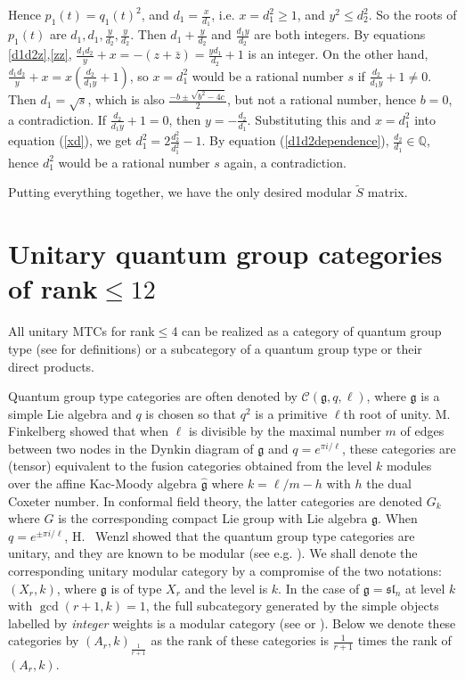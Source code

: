 \documentclass[12pt,psamsfonts]{amsart}
\newcommand{\CC}{\mathcal{C}}
\newcommand{\Rep}{{\rm Rep}}
\newcommand{\g}{\mathfrak{g}}
\newcommand{\Q}{\mathbb Q}
\newcommand{\tS}{\tilde{S}}
\numberwithin{equation}{section}
\theoremstyle{definition}
\begin{document}
Hence $p_1(t)=q_1(t)^2$, and $d_1=\frac{x}{d_1}$, i.e.
$x=d_1^2\geq 1$, and $y^2\leq d_2^2$. So the roots of $p_1(t)$ are
$d_1,d_1,\frac{y}{d_2},\frac{y}{d_2}$. Then $d_1+\frac{y}{d_2}$
and $\frac{d_1y}{d_2}$ are both integers. By equations
\ref{d1d2z},\ref{zz},
$\frac{d_1d_2}{y}+x=-(z+\bar{z})=\frac{yd_1}{d_2}+1$ is an
integer.  On the other hand,
$\frac{d_1d_2}{y}+x=x(\frac{d_2}{d_1y}+1)$, so $x=d_1^2$ would be
a rational number $s$ if $\frac{d_2}{d_1y}+1\neq 0$. Then
$d_1=\sqrt{s}$, which is also $\frac{-b\pm \sqrt{b^2-4c}}{2}$, but
not a rational number, hence $b=0$, a contradiction.  If
$\frac{d_2}{d_1y}+1=0$, then $y=-\frac{d_2}{d_1}$.  Substituting
this and $x=d_1^2$ into equation (\ref{xd}), we get
$d_1^2=2\frac{d_2^2}{d_1^2}-1$.  By equation (\ref{d1d2dependence}),
$\frac{d_2}{d_1}\in \Q$, hence $d_1^2$ would be a rational number
$s$ again, a contradiction.

Putting everything together, we have the only desired modular $\tS$ matrix.

\iffalse
\section{Unitary quantum group categories of rank$\leq12$}\label{quantumgroup}

All unitary MTCs for rank$\leq$4 can be realized as a category of
quantum group type (see \cite{HRW} for definitions) or a
subcategory of a quantum group type or their direct products.

Quantum group type categories are often denoted by
$\CC(\g,q,\ell)$, where $\g$ is a simple Lie algebra and $q$ is
chosen so that $q^2$ is a primitive $\ell$th root of unity. M.~
Finkelberg \cite{finkel} showed that when $\ell$ is divisible by
the maximal number $m$ of edges between two nodes in the Dynkin
diagram of $\g$ and $q=e^{\pi i/\ell}$, these categories are
(tensor) equivalent to the fusion categories obtained from the
level $k$ modules over the affine Kac-Moody algebra $\hat{\g}$
where $k=\ell/m-h$ with $h$ the dual Coxeter number.  In conformal
field theory, the latter categories are denoted $G_k$ where $G$ is
the corresponding compact Lie group with Lie algebra $\g$.  When
$q=e^{\pm \pi i/\ell}$, H.~ Wenzl \cite{wenzlcstar} showed that
the quantum group type categories are unitary, and they are known
to be modular (see e.g. \cite{BK}).  We shall denote the
corresponding unitary modular category by a compromise of the two
notations: $(X_r,k)$, where $\g$ is of type $X_r$ and the level is
$k$.  In the case of $\g=\mathfrak{sl}_n$ at level $k$ with
$\gcd(r+1,k)=1$, the full subcategory generated by the simple
objects labelled by \emph{integer} weights is a modular category
(see \cite{Turaev} or \cite{MW} \cite{Br}).  Below we denote these
categories by $(A_r,k)_{\frac{1}{r+1}}$ as the rank of these
categories is $\frac{1}{r+1}$ times the rank of $(A_r,k)$.
\end{document}

